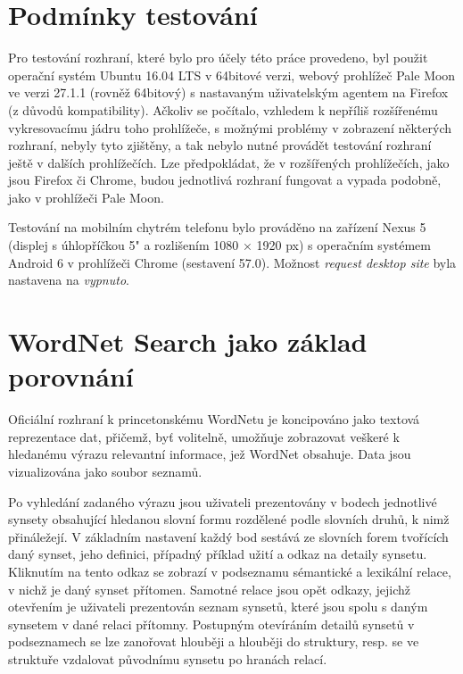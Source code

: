 \documentclass[a4paper, 11pt, oneside]{book}
\begin{document}
			\section{Podmínky testování}

				Pro testování rozhraní, které bylo pro účely této práce provedeno, byl použit operační systém Ubuntu 16.04 LTS v 64bitové verzi, webový prohlížeč Pale Moon ve verzi 27.1.1 (rovněž 64bitový) s nastavaným uživatelským agentem na Firefox (z důvodů kompatibility). Ačkoliv se počítalo, vzhledem k nepříliš rozšířenému vykresovacímu jádru toho prohlížeče, s možnými problémy v zobrazení některých rozhraní, nebyly tyto zjištěny, a tak nebylo nutné provádět testování rozhraní ještě v dalších prohlížečích. Lze předpokládat, že v rozšířených prohlížečích, jako jsou Firefox či Chrome, budou jednotlivá rozhraní fungovat a vypada podobně, jako v prohlížeči Pale Moon.

				Testování na mobilním chytrém telefonu bylo prováděno na zařízení Nexus 5 (displej s úhlopříčkou 5" a rozlišením 1080 × 1920 px) s operačním systémem Android 6 v prohlížeči Chrome (sestavení 57.0). Možnost \textit{request desktop site} byla nastavena na \textit{vypnuto}.

			\section{WordNet Search jako základ porovnání}
			\label{wnvis:wnsearch}

				Oficiální rozhraní k princetonskému WordNetu je koncipováno jako textová reprezentace dat, přičemž, byť volitelně, umožňuje zobrazovat veškeré k hledanému výrazu relevantní informace, jež WordNet obsahuje. Data jsou vizualizována jako soubor seznamů.

				Po vyhledání zadaného výrazu jsou uživateli prezentovány v bodech jednotlivé synsety obsahující hledanou slovní formu rozdělené podle slovních druhů, k nimž přináležejí. V základním nastavení každý bod sestává ze slovních forem tvořících daný synset, jeho definici, případný příklad užití a odkaz na detaily synsetu. Kliknutím na tento odkaz se zobrazí v podseznamu sémantické a lexikální relace, v nichž je daný synset přítomen. Samotné relace jsou opět odkazy, jejichž otevřením je uživateli prezentován seznam synsetů, které jsou spolu s daným synsetem v dané relaci přítomny. Postupným otevíráním detailů synsetů v podseznamech se lze zanořovat hlouběji a hlouběji do struktury, resp. se ve struktuře vzdalovat původnímu synsetu po hranách relací.
\end{document}
